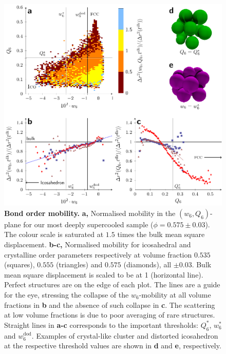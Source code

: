 \clearpage

\begin{figure}
\begin{center}
\includegraphics{fig_msd_Q6_w6.pdf}
\end{center}
\caption{\textbf{Bond order mobility.} {\bf a,} Normalised mobility in the $(w_6, Q_6)$-plane for our most deeply supercooled sample ($\phi = 0.575 \pm 0.03$). The colour scale is saturated at $1.5$ times the bulk mean square displacement. {\bf b-c,} Normalised mobility for icosahedral and crystalline order parameters respectively at volume fraction $0.535$ (squares), $0.555$ (triangles) and $0.575$ (diamonds), all $\pm 0.03$. Bulk mean square displacement is scaled to be at 1 (horizontal line). Perfect structures are on the edge of each plot. The lines are a guide for the eye, stressing the collapse of the $w_6$-mobility at all volume fractions in {\bf b} and the absence of such collapse in {\bf c}. The scattering at low volume fractions is due to poor averaging of rare structures. Straight lines in \textbf{a-c} corresponds to the important thresholds: $Q_6^*$, $w_6^*$ and $w_6^\text{dod}$. Examples of crystal-like cluster and distorted icosahedron at the respective threshold values are shown in \textbf{d} and \textbf{e}, respectively.}
	\label{fig:msd_Q6_w6}
\end{figure}

\clearpage

